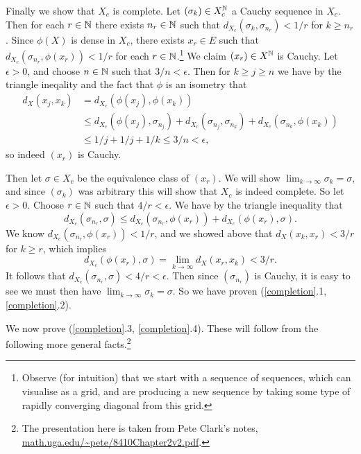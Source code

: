 \begin{nothing}
  Finally we show that $X_c$ is complete. Let $(\sigma_k) \in
  X_c^{\mathbb{N}}$ a Cauchy sequence in $X_c$. Then for each $r \in \mathbb{N}$ there
  exists $n_r \in \mathbb{N}$ such that $d_{X_c} (\sigma_k, \sigma_{n_r}) <
  1/r$ for $k \ge n_r$. Since $\phi(X)$ is dense in $X_c$, there
  exists $x_r \in E$ such that $d_{X_c}(\sigma_{n_r}, \phi(x_r)) <
  1/r$ for each $r \in \mathbb{N}$.\footnote{Observe (for intuition) that we
    start with a sequence of sequences, which can visualise as a grid,
    and are producing a new sequence by taking some type of rapidly
    converging diagonal from this grid.} We claim $(x_r) \in X^{\mathbb{N}}$ is
  Cauchy. Let $\epsilon > 0$, and choose $n \in \mathbb{N}$ such that $3/n <
  \epsilon$. Then for $k \ge j \ge n$ we have by the triangle
  ineqality and the fact that $\phi$ is an isometry that
  \begin{align*}
    d_X(x_j,x_k) &= d_{X_c}(\phi(x_j),\phi(x_k)) \\ &\le
    d_{X_c}(\phi(x_j), \sigma_{n_j}) + d_{X_c}(\sigma_{n_j},
    \sigma_{n_k}) + d_{X_c}(\sigma_{n_k}, \phi(x_k)) \\ &\le 1/j + 1/j
    + 1/k \le 3/n < \epsilon,
  \end{align*}
  so indeed $(x_r)$ is Cauchy.

  Then let $\sigma \in X_c$ be the equivalence class of $(x_r)$. We
  will show $\lim_{k \to \infty} \sigma_k = \sigma$, and since
  $(\sigma_k)$ was arbitrary this will show that $X_c$ is indeed
  complete. So let $\epsilon > 0$. Choose $r \in \mathbb{N}$ such that $4/r <
  \epsilon$. We have by the triangle inequality that
  \[
  d_{X_c}(\sigma_{n_r}, \sigma) \le d_{X_c}(\sigma_{n_r}, \phi(x_r)) +
  d_{X_c}(\phi(x_r), \sigma).
  \]
  We know $d_{X_c}(\sigma_{n_r}, \phi(x_r)) < 1/r$, and we showed
  above that $d_X(x_k,x_r) < 3/r$ for $k \ge r$, which implies
  \[
  d_{X_c}(\phi(x_r), \sigma) = \lim_{k \to \infty} d_X(x_r,x_k) < 3/r.
  \]
  It follows that $d_{X_c}(\sigma_{n_r}, \sigma) < 4/r <
  \epsilon$. Then since $(\sigma_{n_r})$ is Cauchy, it is easy to see
  we must then have $\lim_{k \to \infty} \sigma_k = \sigma$. So we
  have proven (\ref{completion}.1, \ref{completion}.2).
\end{nothing}

We now prove (\ref{completion}.3, \ref{completion}.4). These will
follow from the following more general facts.\footnote{The
  presentation here is taken from Pete Clark's notes,
  \url{math.uga.edu/~pete/8410Chapter2v2.pdf}.}

